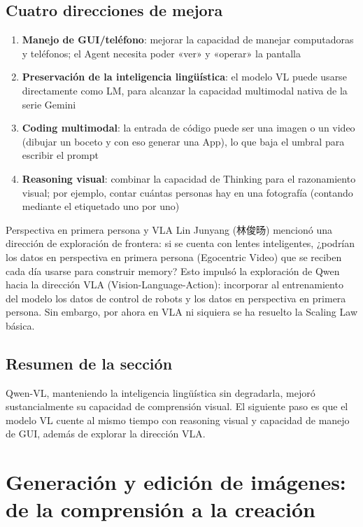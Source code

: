 \documentclass[a4paper]{article}
\begin{document}
\subsection{Cuatro direcciones de mejora}

\begin{enumerate}
    \item \textbf{Manejo de GUI/teléfono}: mejorar la capacidad de manejar computadoras y teléfonos; el Agent necesita poder «ver» y «operar» la pantalla
    \item \textbf{Preservación de la inteligencia lingüística}: el modelo VL puede usarse directamente como LM, para alcanzar la capacidad multimodal nativa de la serie Gemini
    \item \textbf{Coding multimodal}: la entrada de código puede ser una imagen o un video (dibujar un boceto y con eso generar una App), lo que baja el umbral para escribir el prompt
    \item \textbf{Reasoning visual}: combinar la capacidad de Thinking para el razonamiento visual; por ejemplo, contar cuántas personas hay en una fotografía (contando mediante el etiquetado uno por uno)
\end{enumerate}

\begin{knowledgebox}{Perspectiva en primera persona y VLA}
Lin Junyang (林俊旸) mencionó una dirección de exploración de frontera: si se cuenta con lentes inteligentes, ¿podrían los datos en perspectiva en primera persona (Egocentric Video) que se reciben cada día usarse para construir memory? Esto impulsó la exploración de Qwen hacia la dirección VLA (Vision-Language-Action): incorporar al entrenamiento del modelo los datos de control de robots y los datos en perspectiva en primera persona. Sin embargo, por ahora en VLA ni siquiera se ha resuelto la Scaling Law básica.
\end{knowledgebox}

\subsection{Resumen de la sección}

Qwen-VL, manteniendo la inteligencia lingüística sin degradarla, mejoró sustancialmente su capacidad de comprensión visual. El siguiente paso es que el modelo VL cuente al mismo tiempo con reasoning visual y capacidad de manejo de GUI, además de explorar la dirección VLA.
\section{Generación y edición de imágenes: de la comprensión a la creación}
\end{document}

